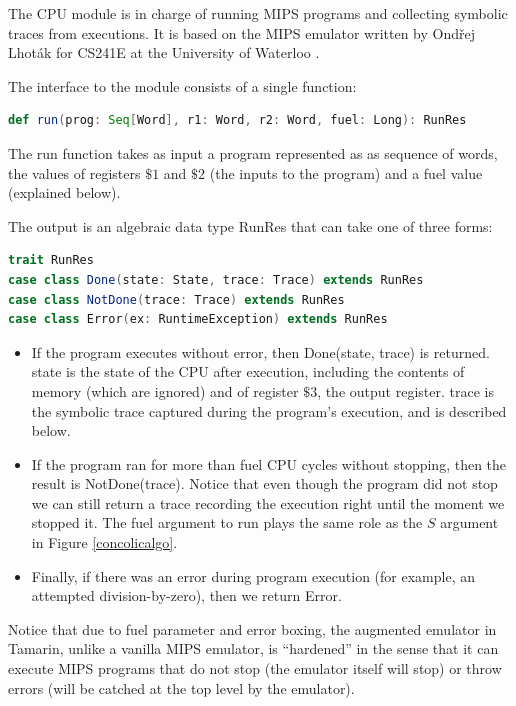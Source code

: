\documentclass{llncs}
\begin{document}
The \textsf{CPU} module is in charge of running MIPS programs and collecting symbolic traces from executions. It is based on the MIPS emulator written by Ond\v{r}ej Lhot\'{a}k for CS241E at the University of Waterloo \cite{cs241e}.

The interface to the module consists of a single function:

\begin{lstlisting}[language=scala]
def run(prog: Seq[Word], r1: Word, r2: Word, fuel: Long): RunRes
\end{lstlisting}

The \textsf{run} function takes as input a program represented as as sequence of words, the values of registers $\$1$ and $\$2$ (the inputs to the program) and a \textsf{fuel} value (explained below).

The output is an algebraic data type \textsf{RunRes} that can take one of three forms:

\begin{lstlisting}[language=scala]
trait RunRes
case class Done(state: State, trace: Trace) extends RunRes
case class NotDone(trace: Trace) extends RunRes
case class Error(ex: RuntimeException) extends RunRes
\end{lstlisting}

\begin{itemize}
\item If the program executes without error, then \textsf{Done(state, trace)} is returned. \textsf{state} is the state of the CPU after execution, including the contents of memory (which are ignored) and of register $\$3$, the output register. \textsf{trace} is the symbolic trace captured during the program's execution, and is described below.
\item If the program ran for more than \textsf{fuel} CPU cycles without stopping, then the result is \textsf{NotDone(trace)}. Notice that even though the program did not stop we can still return a trace recording the execution right until the moment we stopped it. The \textsf{fuel} argument to \textsf{run} plays the same role as the $S$ argument in Figure \ref{concolicalgo}. 
\item Finally, if there was an error during program execution (for example, an attempted division-by-zero), then we return \textsf{Error}.
\end{itemize}

Notice that due to \textsf{fuel} parameter and error boxing, the augmented emulator in Tamarin, unlike a vanilla MIPS emulator, is ``hardened'' in the sense that it can execute MIPS programs that do not stop (the emulator itself will stop) or throw errors (will be catched at the top level by the emulator). 
\end{document}
